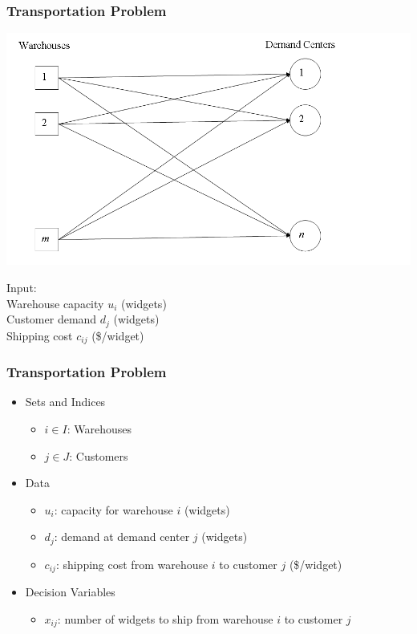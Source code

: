 \documentclass[12pt,handout]{beamer}
\begin{document}
\begin{frame}
\frametitle{Transportation Problem}
\begin{center}
\includegraphics[scale = 0.3]{transportation_problem.png}
\end{center}
Input: \\
Warehouse capacity $u_i$ (widgets) \\
Customer demand $d_j$ (widgets) \\
Shipping cost $c_{ij}$ (\$/widget)
\end{frame}

\begin{frame}
\frametitle{Transportation Problem}
\begin{itemize}
\item Sets and Indices
    \begin{itemize}
    \item $i \in I$: Warehouses
    \item $j \in J$: Customers
    \end{itemize}
\item Data
    \begin{itemize}
    \item $u_i$: capacity for warehouse $i$ (widgets)
    \item $d_j$: demand at demand center $j$ (widgets)
    \item $c_{ij}$: shipping cost from warehouse $i$ to customer $j$ (\$/widget)
    \end{itemize}
\item Decision Variables
    \begin{itemize}
    \item $x_{ij}$: number of widgets to ship from warehouse $i$ to customer $j$
    \end{itemize}
\end{itemize}
\end{frame}
\end{document}
